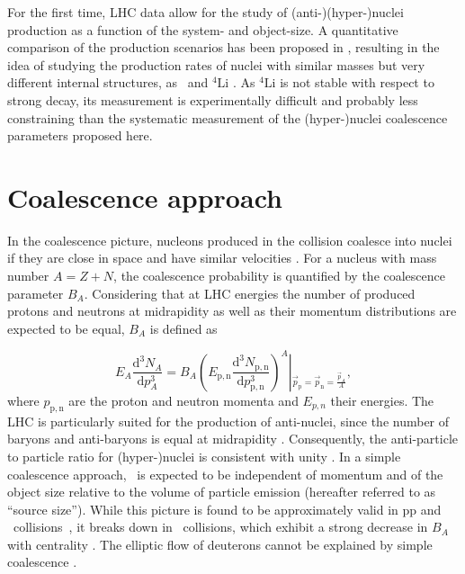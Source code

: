 \documentclass[%
 reprint,
 amsmath,amssymb,
 aps,
]{revtex4-1}
\begin{document}
\indent For the first time, LHC data allow for the study of \mbox{(anti-)(hyper-)nuclei} production as a function of the system- and object-size. 
A quantitative comparison of the production scenarios has been proposed in \cite{Mrowczynski:2016xqm}, resulting in the idea of studying the production rates of nuclei with similar masses but very different internal structures, as \hefour~and ${}^{4}\mathrm{Li}$ \cite{Bazak:2018hgl}. 
As ${}^{4}\mathrm{Li}$ is not stable with respect to strong decay, its measurement is experimentally difficult and probably less constraining than the systematic measurement of the (hyper-)nuclei coalescence parameters proposed here.

 
\section{Coalescence approach} \label{sec:coalescence}
In the coalescence picture, nucleons produced in the collision coalesce into nuclei if they are close in space and have similar velocities \cite{Butler:1963,Kapusta:1980}. 
For a nucleus with mass number $A = Z + N$, the coalescence probability is quantified by the coalescence parameter $B_{A}$.
Considering that at LHC energies the number of produced protons and neutrons at midrapidity as well as their momentum distributions are expected to be equal, $B_{A}$ is defined as

\begin{equation}
E_{A}\frac{\mathrm{d}^{3}N_{A}}{\mathrm{d}p_{A}^{3}}=B_{A}{\left(E_{\mathrm{p,n}}\frac{\mathrm{d}^{3}N_{\mathrm{p,n}}}{\mathrm{d}p_{\mathrm{p,n}}^{3}}\right)^{A}}\left\vert_{\vec{p}_{\mathrm{p}}=\vec{p}_{\mathrm{n}}=\frac{\vec{p}_{A}}{A}} \right.,
\label{eq:BA}
\end{equation}
%
where $p_{\mathrm{p,n}}$ are the proton and neutron momenta and $E_{p,n}$ their energies.
%
The LHC is particularly suited for the production of anti-nuclei, since the number of baryons and anti-baryons is equal at midrapidity \cite{Abbas:2013rua}. Consequently, the anti-particle to particle ratio for \mbox{(hyper-)nuclei} is consistent with unity \cite{ALICE:nucleipp2017, Acharya:2019rgc, anielski-HQ14, Acharya:2017dmc, Adam:2015yta}.
In a simple coalescence approach, \bA~is expected to be independent of momentum and of the object size relative to the volume of particle emission (hereafter referred to as ``source size'').
While this picture is found to be approximately valid in pp and \pPb~collisions~\cite{ALICE:nucleipp2017, Acharya:2019rgc, anielski-HQ14}, it breaks down in \PbPb~collisions, which exhibit a strong decrease in $B_{A}$ with centrality \cite{ALICE:deuteronppPbPb2015}. 
The elliptic flow of deuterons cannot be explained by simple coalescence \cite{Acharya:2017dmc}. 
\end{document}
